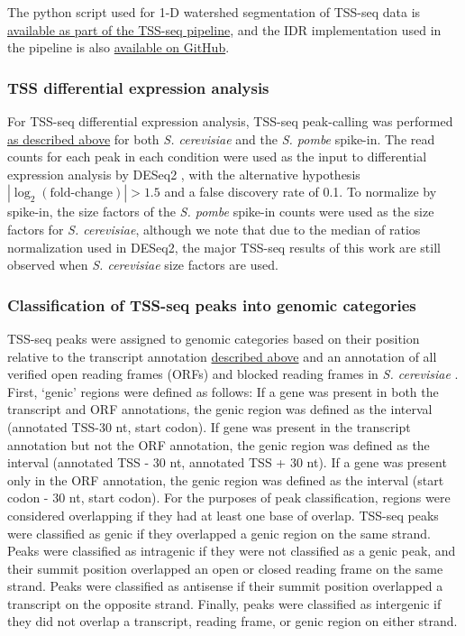 The python script used for 1-D watershed segmentation of TSS-seq data is \href{https://github.com/winston-lab/tss-seq/blob/master/scripts/tss_peakcalling.py}{available as part of the TSS-seq pipeline}, and the IDR implementation used in the pipeline is also \href{https://github.com/nboley/idr}{available on GitHub}.

\subsubsection{TSS differential expression analysis}
\label{subsubsec:tss_differential_expression}

For TSS-seq differential expression analysis, TSS-seq peak-calling was performed \hyperref[subsubsec:tss_peak_calling]{as described above} for both \textit{S. cerevisiae} and the \textit{S. pombe} spike-in.
The read counts for each peak in each condition were used as the input to differential expression analysis by DESeq2 \citep{love2014}, with the alternative hypothesis $\allowbreak \left\lvert\log_2 \left(\text{fold-change}\right) \right\rvert > 1.5$ and a false discovery rate of 0.1.
To normalize by spike-in, the size factors of the \textit{S. pombe} spike-in counts were used as the size factors for \textit{S. cerevisiae}, although we note that due to the median of ratios normalization used in DESeq2, the major TSS-seq results of this work are still observed when \textit{S. cerevisiae} size factors are used.

\subsubsection{Classification of TSS-seq peaks into genomic categories}
\label{subsubsec:tss_peak_classification}

TSS-seq peaks were assigned to genomic categories based on their position relative to the transcript annotation \hyperref[subsubsec:tss_reannotation]{described above} and an annotation of all verified open reading frames (ORFs) and blocked reading frames in \textit{S. cerevisiae} \citep{engel2014}.
First, `genic' regions were defined as follows: If a gene was present in both the transcript and ORF annotations, the genic region was defined as the interval (annotated TSS-30 nt, start codon).
If gene was present in the transcript annotation but not the ORF annotation, the genic region was defined as the interval (annotated TSS - 30 nt, annotated TSS + 30 nt).
If a gene was present only in the ORF annotation, the genic region was defined as the interval (start codon - 30 nt, start codon).
For the purposes of peak classification, regions were considered overlapping if they had at least one base of overlap.
TSS-seq peaks were classified as genic if they overlapped a genic region on the same strand.
Peaks were classified as intragenic if they were not classified as a genic peak, and their summit position overlapped an open or closed reading frame on the same strand.
Peaks were classified as antisense if their summit position overlapped a transcript on the opposite strand.
Finally, peaks were classified as intergenic if they did not overlap a transcript, reading frame, or genic region on either strand.

